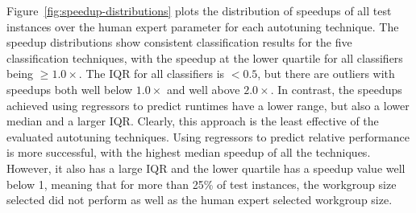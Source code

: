\documentclass[preprint,nonatbib,10pt]{sigplanconf}
\begin{document}
Figure~\ref{fig:speedup-distributions} plots the distribution of
speedups of all test instances over the human expert parameter for
each autotuning technique. The speedup distributions show consistent
classification results for the five classification techniques, with
the speedup at the lower quartile for all classifiers being
$\ge 1.0\times$. The IQR for all classifiers is $< 0.5$, but there are
outliers with speedups both well below $1.0\times$ and well above
$2.0\times$. In contrast, the speedups achieved using regressors to
predict runtimes have a lower range, but also a lower median and a
larger IQR. Clearly, this approach is the least effective of the
evaluated autotuning techniques. Using regressors to predict relative
performance is more successful, with the highest median speedup of all
the techniques. However, it also has a large IQR and the lower
quartile has a speedup value well below 1, meaning that for more than
25\% of test instances, the workgroup size selected did not perform as
well as the human expert selected workgroup size.
\end{document}
